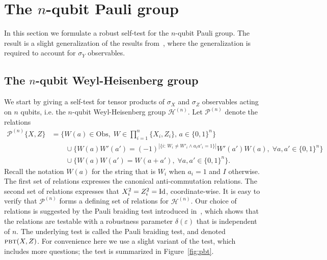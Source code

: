 \documentclass[11pt]{article}
\theoremstyle{remark}
\theoremstyle{definition}
\newcommand{\Id}{\ensuremath{\mathop{\rm Id}\nolimits}}
\newcommand{\setft}[1]{\mathrm{#1}}
\newcommand{\Obs}{\setft{Obs}}
\newcommand{\eps}{\varepsilon}
\newcommand{\pbt}{\textsc{pbt}}
\newcommand{\heisgn}{{\mathcal{H}^{(n)}}}
\newcommand{\paulin}{\mathcal{P}^{(n)}\!}
\begin{document}
\section{The $n$-qubit Pauli group}
\label{sec:pauli-group}

In this section we formulate a robust self-test for the $n$-qubit Pauli group. The result is a slight generalization of the results from~\cite{natarajan2016robust}, where the generalization is required to account for $\sigma_Y$ observables. 

\subsection{The $n$-qubit Weyl-Heisenberg group}
\label{sec:pbt}

We start by giving a self-test for tensor products of $\sigma_X$ and $\sigma_Z$ 
observables acting on $n$ qubits, i.e. the $n$-qubit Weyl-Heisenberg group $\heisgn$. 
Let $\mathcal{P}^{(n)}$ denote the relations  
\begin{align*}
\paulin\{X,Z\} &= \Big\{ W(a)\in\Obs,\;W \in \prod_{i=1}^n \{X_i,Z_i\},\,a\in\{0,1\}^n\Big\}\\
&\qquad\cup \Big\{W(a)W'(a')=(-1)^{|\{i:\,W_i\neq W'_i \wedge a_ia'_i=1\}|} W'(a')W(a),\;\forall a,a'\in\{0,1\}^n\Big\}\\
&\qquad \cup\Big\{ W(a)W(a')=W(a+a'),\;\forall a,a'\in\{0,1\}^n\Big\}.
\end{align*}
Recall the notation $W(a)$ for the string that is $W_i$ when $a_i=1$ and $I$ otherwise. 
The first set of relations expresses the canonical anti-commutation relations. The second set of relations expresses that $X_i^2=Z_i^2=\Id$, coordinate-wise. It is easy to verify that $\mathcal{P}^{(n)}$ forms a defining set of relations for $\heisgn$. Our choice of relations is suggested by the Pauli braiding test introduced in~\cite{natarajan2016robust}, which shows that the relations are testable with a robustness parameter $\delta(\eps)$ that is independent of $n$. 
The underlying test is called the Pauli braiding test, and denoted $\pbt(X,Z)$. For convenience here we use a slight variant of the test, which includes more questions; the test is summarized in Figure~\ref{fig:pbt}. 
\end{document}
